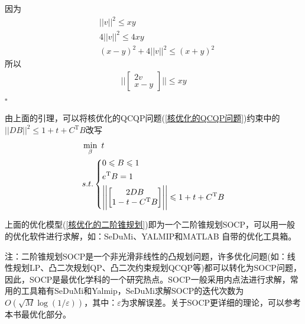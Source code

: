         \begin{Proof}
        因为
        \begin{align*}
        & ||v||^2 \leqslant xy\\
        & 4||v||^2 \leqslant 4xy\\
        & (x-y)^2 + 4||v||^2 \leqslant (x+y)^2
        \end{align*}
        所以
        \begin{align*}
        \Biggl |\Biggl|
        \begin{bmatrix}
        2v\\
        x-y
        \end{bmatrix}
        \Biggr |\Biggr|
        \leqslant xy
        \end{align*}
        $\square$
        \end{Proof}
        由上面的引理，可以将核优化的QCQP问题(\ref{核优化的QCQP问题})约束中的$||DB||^2 \leqslant 1+t+ C^\mathrm{T}B$改写
        \begin{align}
        \label{核优化的二阶锥规划}
        &\min_\beta  \ t \notag\\
        &s.t.
        \left\{
        \begin{aligned}
        & 0 \leqslant B \leqslant 1\\
        & e^\mathrm{T} B = 1 \\
        & \Biggl |\Biggl|
        \begin{bmatrix}
        2DB\\
        1-t-C^\mathrm{T}B
        \end{bmatrix}
        \Biggr |\Biggr| \leqslant 1+t+C^\mathrm{T}B
        \end{aligned}
        \right.
        \end{align}
        \par
        上面的优化模型(\ref{核优化的二阶锥规划})即为一个二阶锥规划SOCP，可以用一般的优化软件进行求解，如：SeDuMi、YALMIP和MATLAB 自带的优化工具箱。
        \par
        注：二阶锥规划SOCP是一个非光滑非线性的凸规划问题，许多优化问题(如：线性规划LP、凸二次规划QP、凸二次约束规划QCQP等)都可以转化为SOCP问题，因此，SOCP是最优化学科的一个研究热点。SOCP一般采用内点法进行求解，常用的工具箱有SeDuMi和Yalmip，SeDuMi求解SOCP的迭代次数为$O(\sqrt{M}\log (1/\varepsilon))$，其中：$\varepsilon$为求解误差。关于SOCP更详细的理论，可以参考本书最优化部分。

